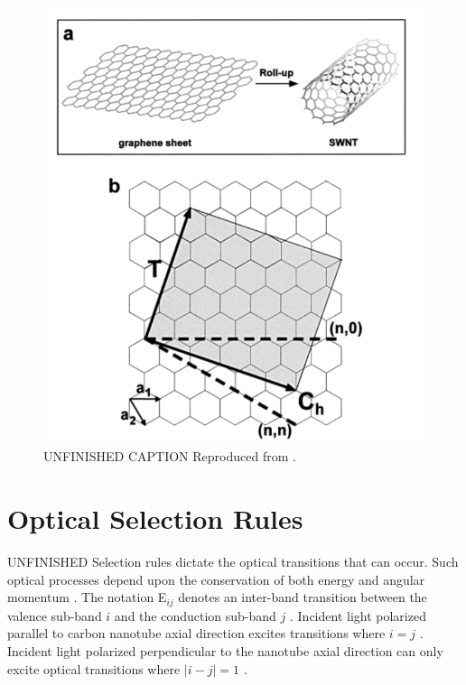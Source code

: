 \begin{figure}[H]
	\centering
	\includegraphics[scale=0.7]{images/chapter_optical_props/chiral_vectors.png}
	\caption{{\color{red}UNFINISHED CAPTION} Reproduced from \cite{odom2000structure}.}
	\label{fig:chiral_vectors}
\end{figure}


\section{Optical Selection Rules}

{\color{red}UNFINISHED} Selection rules dictate the optical transitions that can occur. Such optical processes depend upon the conservation of both energy and angular momentum \cite{weismanKonoBook}. The notation E$_{ij}$ denotes an inter-band transition between the valence sub-band $i$ and the conduction sub-band $j$ \cite{weismanKonoBook}. Incident light polarized parallel to carbon nanotube axial direction excites transitions where $i=j$ \cite{weismanKonoBook}. Incident light polarized perpendicular to the nanotube axial direction can only excite optical transitions where $|i-j|=1$ \cite{weismanKonoBook}. 


